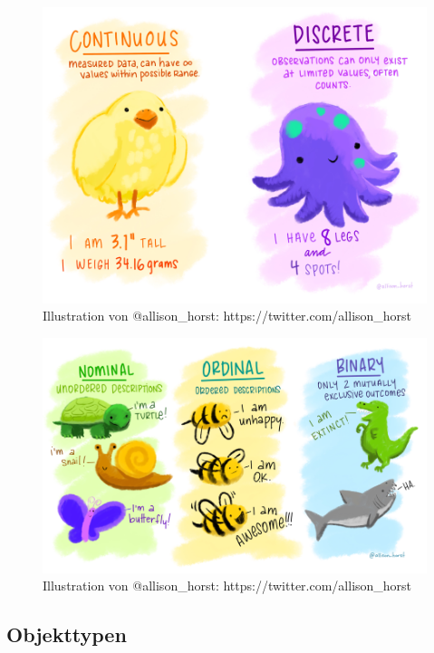 \documentclass[
]{article}
\begin{document}
\begin{figure}

{\centering \includegraphics[width=57.15in]{images/018} 

}

\caption{Illustration von @allison_horst: https://twitter.com/allison_horst}\label{fig:unnamed-chunk-38}
\end{figure}
\begin{figure}

{\centering \includegraphics[width=69.44in]{images/019} 

}

\caption{Illustration von @allison_horst: https://twitter.com/allison_horst}\label{fig:unnamed-chunk-39}
\end{figure}

\hypertarget{objekttypen}{%
\subsection{Objekttypen}\label{objekttypen}}
\end{document}

